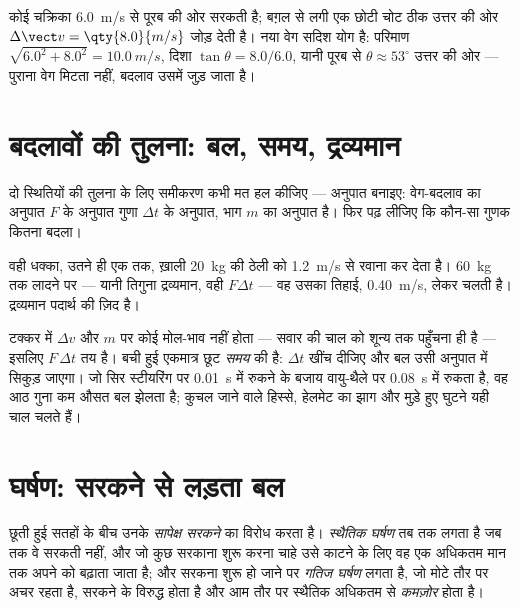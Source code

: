 \begin{example}[बग़ल से एक ठोकर]\label{ex:g11:forces-and-motion:kick}
कोई चक्रिका \qty{6.0}{m/s} से पूरब की ओर सरकती है; बग़ल से लगी एक छोटी चोट ठीक उत्तर
की ओर $\Delta\vect v = \qty{8.0}{m/s}$ जोड़ देती है। नया वेग सदिश योग है: परिमाण $\sqrt{6.0^2 + 8.0^2} = \qty{10.0}{m/s}$, दिशा $\tan\theta = 8.0/6.0$,
यानी पूरब से $\theta \approx 53^\circ$ उत्तर की ओर --- पुराना वेग मिटता नहीं, बदलाव उसमें जुड़
जाता है।
\end{example}

\section{बदलावों की तुलना: बल, समय, द्रव्यमान}

\begin{method}[अनुपात से सोचना]\label{met:g11:forces-and-motion:ratio}
दो स्थितियों की तुलना के लिए समीकरण कभी मत हल कीजिए --- अनुपात बनाइए:
वेग-बदलाव का अनुपात $F$ के अनुपात गुणा $\Delta t$ के अनुपात, भाग $m$ का
अनुपात है। फिर पढ़ लीजिए कि कौन-सा गुणक कितना बदला।
\end{method}

\begin{example}[लदी हुई ठेली]\label{ex:g11:forces-and-motion:cart}
वही धक्का, उतने ही एक  तक, ख़ाली \qty{20}{kg} की ठेली को \qty{1.2}{m/s} से रवाना कर
देता है। \qty{60}{kg} तक लादने पर --- यानी तिगुना द्रव्यमान, वही $F\Delta t$ --- वह
उसका तिहाई, \qty{0.40}{m/s}, लेकर चलती है। द्रव्यमान पदार्थ की ज़िद है।
\end{example}

\begin{remark}[टक्करें, वायु-थैले, मुड़े हुए घुटने]\label{rem:g11:forces-and-motion:airbag}
टक्कर में $\Delta v$ और $m$ पर कोई मोल-भाव नहीं होता --- सवार की चाल को शून्य
तक पहुँचना ही है --- इसलिए $F\,\Delta t$ तय है। बची हुई एकमात्र छूट \emph{समय} की
है: $\Delta t$ खींच दीजिए और बल उसी अनुपात में सिकुड़ जाएगा। जो सिर
स्टीयरिंग पर \qty{0.01}{s} में रुकने के बजाय वायु-थैले पर \qty{0.08}{s} में रुकता है, वह
आठ गुना कम औसत बल झेलता है; कुचल जाने वाले हिस्से, हेलमेट का झाग और
मुड़े हुए घुटने यही चाल चलते हैं।
\end{remark}

\section{घर्षण: सरकने से लड़ता बल}

\begin{definition}[स्थैतिक और गतिज घर्षण]\label{def:g11:forces-and-motion:friction}
छूती हुई सतहों के बीच  उनके \emph{सापेक्ष सरकने} का विरोध करता
है। \emph{स्थैतिक घर्षण} तब तक लगता है जब तक वे सरकती
नहीं, और जो कुछ सरकाना शुरू करना चाहे उसे काटने के लिए वह एक अधिकतम मान तक
अपने को बढ़ाता जाता है; और सरकना शुरू हो जाने पर \emph{गतिज
घर्षण} लगता है, जो मोटे तौर पर अचर रहता है, सरकने के
विरुद्ध होता है और आम तौर पर स्थैतिक अधिकतम से \emph{कमज़ोर} होता है।
\end{definition}

